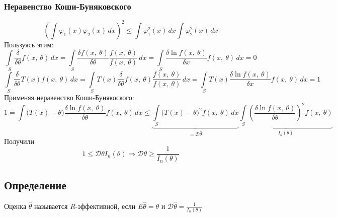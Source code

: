 \documentclass[12pt, a4paper]{article}
\newcommand{\dev}{\mathcal{D}}
\begin{document}
\subsubsection*{Неравенство Коши-Буняковского}
\[\left( \int \varphi_1(x)\varphi_2(x)\, dx \right)^2 \leq \int \varphi_1^2(x)\, dx\int \varphi_2^2(x)\, dx\]
Пользуясь этим:
\[\int\limits_S \frac{\delta}{\delta \theta} f(x,\ \theta)\, dx = \int\limits_S \frac{\delta f(x,\ \theta)}{\delta \theta} \frac{f(x,\ \theta)}{f(x,\ \theta)}\, dx = \int\limits_S \frac{\delta \ln f(x,\ \theta)}{\delta x} f(x,\ \theta)\, dx = 0\]
\[\int\limits_S \frac{\delta}{\delta \theta} T(x) f(x,\ \theta)\, dx = \int\limits_S T(x) \frac{\delta}{\delta \theta} f(x,\ \theta) \frac{f(x,\ \theta)}{f(x,\ \theta)}\, dx = \int\limits_S T(x) \frac{\delta \ln f(x,\ \theta)}{\delta x} f(x,\ \theta)\, dx = 1\]
Применяя неравенство Коши-Бунякоского:
\[1 = \int \big( T(x) - \theta \big) \frac{\delta \ln f(x,\ \theta)}{\delta \theta} f(x,\ \theta)\, dx \leq \underset{=\dev\hat{\theta}}{\underbrace{\int\limits_S \big( T(x) - \theta \big)^2 f(x,\ \theta)\, dx}} \underset{I_n(\theta)}{\underbrace{\int\limits_S\left( \frac{\delta \ln f(x,\ \theta)}{\delta \theta} \right)^2 f(x,\ \theta)}}\]
Получили
\[1 \leq \dev \theta I_n(\theta)\Rightarrow \dev \theta \geq \frac{1}{I_n(\theta)}\]
\subsection*{Определение}
Оценка $\hat{\theta}$ называется $R$-эффективной, если $E\hat{\theta} = \theta$ и $\dev \hat{\theta} = \frac{1}{I_n(\theta)}$
\end{document}
